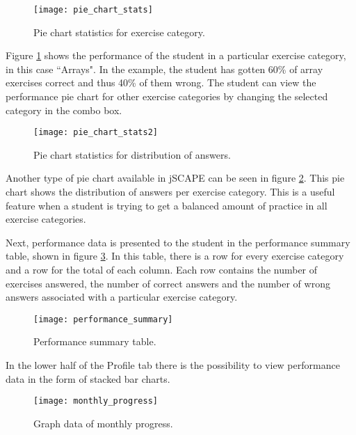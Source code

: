\begin{figure}[H]
\centering
\texttt{[image: pie\_chart\_stats]}
\caption{Pie chart statistics for exercise category.}
\label{fig:pie_chart_stats1}
\end{figure}

Figure \ref{fig:pie_chart_stats1} shows the performance of the student in a particular exercise category, in this case ``Arrays". In the example, the student has gotten 60\% of array exercises correct and thus 40\% of them wrong. The student can view the performance pie chart for other exercise categories by changing the selected category in the combo box.

\begin{figure}[H]
\centering
\texttt{[image: pie\_chart\_stats2]}
\caption{Pie chart statistics for distribution of answers.}
\label{fig:pie_chart_stats2}
\end{figure}

Another type of pie chart available in jSCAPE can be seen in figure \ref{fig:pie_chart_stats2}. This pie chart shows the distribution of answers per exercise category. This is a useful feature when a student is trying to get a balanced amount of practice in all exercise categories. \newline

Next, performance data is presented to the student in the performance summary table, shown in figure \ref{fig:performance_summary}. In this table, there is a row for every exercise category and a row for the total of each column. Each row contains the number of exercises answered, the number of correct answers and the number of wrong answers associated with a particular exercise category.

\begin{figure}[H]
\centering
\texttt{[image: performance\_summary]}
\caption{Performance summary table.}
\label{fig:performance_summary}
\end{figure}

In the lower half of the Profile tab there is the possibility to view performance data in the form of stacked bar charts.

\begin{figure}[H]
\centering
\texttt{[image: monthly\_progress]}
\caption{Graph data of monthly progress.}
\label{fig:monthly_progress}
\end{figure}


